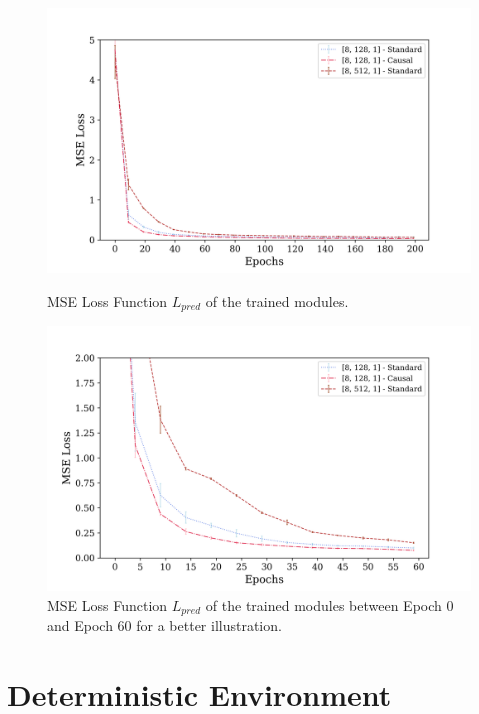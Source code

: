         \begin{figure}[hbtp]
            \centering
            \includegraphics[width=15cm, keepaspectratio]{images/results/module_causal_1.png}
            \caption{MSE Loss Function $L_{pred}$ of the trained modules.}
            \label{fig:results_causal_1}
            
            \vspace{1.0cm}
            
            \includegraphics[width=15cm, keepaspectratio]{images/results/module_causal_2.png}
            \caption{MSE Loss Function $L_{pred}$ of the trained modules between Epoch 0 and Epoch 60 for a better illustration.}
            \label{fig:results_causal_2}
        \end{figure}
        
    \newpage
    \section{Deterministic Environment}
    \label{results:deterministic}
        

